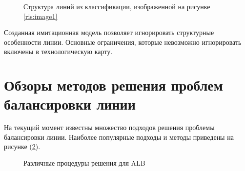 \begin{figure}[H]
    \caption{Структура линий из классификации, изображенной на рисунке \ref{ris:image1}}
    \label{ris:shapeOfLines}
\end{figure}

Созданная имитационная модель позволяет игнорировать структурные особенности линии. Основные ограничения, которые невозможно игнорировать включены в технологическую карту. 




\section{Обзоры методов решения проблем балансировки линии}

На текущий момент известны множество подходов решения проблемы балансировки линии. Наиболее популярные подходы и методы приведены на рисунке (\ref{ris:Approaches}).

\begin{figure}[H]
    \caption{Различные процедуры решения для ALB}
    \label{ris:Approaches}
\end{figure}

